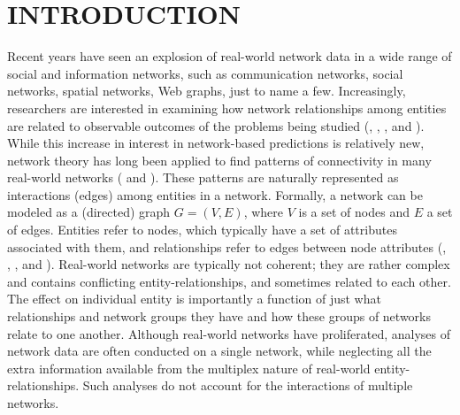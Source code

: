 \documentclass[times, doublespace]{auth}
\begin{document}


\maketitle



\newpage


\section{INTRODUCTION}

Recent years have seen an explosion of real-world network data in a wide range of social and information networks, such as communication networks, social networks, spatial networks, Web graphs, just to name a few. Increasingly, researchers are interested in examining how network relationships among entities are related to observable outcomes of the problems being studied (\cite{R22}, \cite{R26}, \cite{R23}, and \cite{R24}). While this increase in interest in network-based predictions is relatively new, network theory has long been applied to find patterns of connectivity in many real-world networks (\cite{R25} and \cite{R27}). These patterns are naturally represented as interactions (edges) among entities in a network. Formally, a network can be modeled as a (directed) graph $G=(V,E)$, where $V$ is a set of nodes and $E$ a set of edges. Entities refer to nodes, which typically have a set of attributes associated with them, and relationships refer to edges between node attributes (\cite{R12}, \cite{R2}, \cite{R17}, and \cite{R19}). Real-world networks are typically not coherent; they are rather complex and contains conflicting entity-relationships, and sometimes related to each other. The effect on individual entity is importantly a function of just what relationships and network groups they have and how these groups of networks relate to one another. Although real-world networks have proliferated, analyses of network data are often conducted on a single network, while neglecting all the extra information available from the multiplex nature of real-world entity-relationships. Such analyses do not account for the interactions of multiple networks.   
\newline
\end{document}
